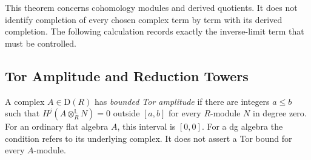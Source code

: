 This theorem concerns cohomology modules and derived quotients.
It does not identify completion of every chosen complex term
by term with its derived completion.
The following calculation records exactly the inverse-limit
term that must be controlled.

\subsection{Tor Amplitude and Reduction Towers}
\label{v4-arith:w5-d:der-compl:tor-hypothesis}

\begin{definition}
\label{v4-arith:w5-d:der-compl:def:bdd-tor}
A complex \(A\in\mathrm D(R)\) has
\emph{bounded Tor amplitude} if there are integers \(a\le b\)
such that \(H^j(A\otimes_R^{\mathbb L}N)=0\) outside \([a,b]\)
for every \(R\)-module \(N\) in degree zero.
For an ordinary flat algebra \(A\), this interval is \([0,0]\).
For a dg algebra the condition refers to its underlying complex.
It does not assert a Tor bound for every \(A\)-module.
\end{definition}


